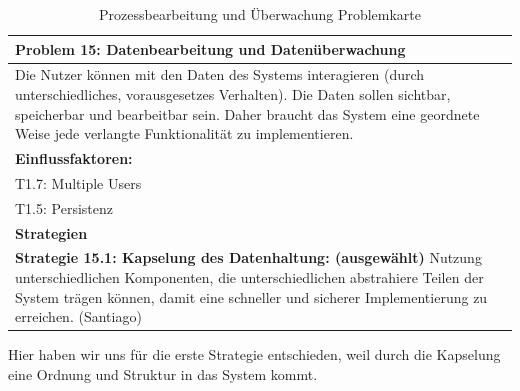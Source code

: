 \documentclass[enabledeprecatedfontcommands,fontsize=12pt,paper=a4,twoside]{scrartcl}
\begin{document}
\begin{table}[H]
    \centering
    \begin{tabular}{|p{15cm}|}
    \hline
          \textbf{Problem 15:} Datenbearbeitung und Datenüberwachung %
          \\ \hline 
Die Nutzer können mit den Daten des Systems interagieren (durch unterschiedliches, vorausgesetzes Verhalten). Die Daten sollen sichtbar, speicherbar und bearbeitbar sein. Daher braucht das System eine geordnete Weise jede verlangte Funktionalität zu implementieren. 
          \\ \hline
          \textbf{Einflussfaktoren: } \\
          T1.7: Multiple Users\\
	      T1.5: Persistenz\\
          \hline
          \textbf{Strategien} \\ \hline 
          
            \textbf{Strategie 15.1: Kapselung des Datenhaltung: (ausgewählt)} Nutzung unterschiedlichen Komponenten, die unterschiedlichen abstrahiere Teilen der System trägen können, damit eine schneller und sicherer Implementierung  zu erreichen. (Santiago)
		{}          
           \label{strategie:15.1} 
            \\ \hline
    \end{tabular}
    \caption{Prozessbearbeitung und Überwachung Problemkarte}
    \label{tab:ProblemKarte15}
\end{table}
Hier haben wir uns für die erste Strategie entschieden, weil durch die Kapselung eine Ordnung und Struktur in das System kommt. \\
\end{document}
